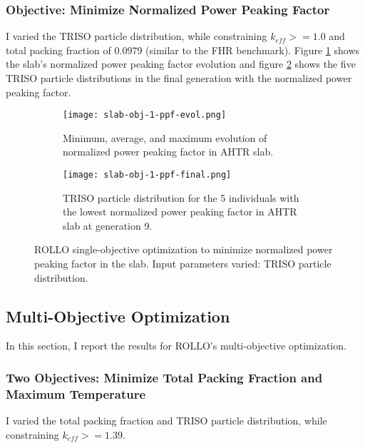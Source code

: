 \subsubsection{Objective: Minimize Normalized Power Peaking Factor}
I varied the TRISO particle distribution, while constraining $k_{eff} >= 1.0$ and 
total packing fraction of 0.0979 (similar to the FHR benchmark). 
Figure \ref{fig:slab-obj-1-ppf-evol} shows the slab's normalized power peaking 
factor evolution and figure \ref{fig:slab-obj-1-ppf-final} shows the five TRISO particle 
distributions in the final generation with the normalized power peaking factor. 
\begin{figure}[]
    \centering
    \begin{subfigure}{\textwidth}
        \texttt{[image: slab-obj-1-ppf-evol.png]}
        \caption{Minimum, average, and maximum evolution of normalized power 
        peaking factor in AHTR slab.}
        \label{fig:slab-obj-1-ppf-evol} 
    \end{subfigure}
    \begin{subfigure}{\textwidth}
        \texttt{[image: slab-obj-1-ppf-final.png]}
        \caption{TRISO particle distribution for the 5 individuals with the 
        lowest normalized power peaking factor in AHTR slab at generation 9.}
        \label{fig:slab-obj-1-ppf-final} 
    \end{subfigure}
    \caption{ROLLO single-objective optimization to minimize normalized power 
    peaking factor in the slab. Input parameters varied: TRISO particle distribution.}
    \label{fig:slab-obj-1-ppf}
\end{figure}

\subsection{Multi-Objective Optimization}
In this section, I report the results for ROLLO's multi-objective optimization. 

\subsubsection{Two Objectives: Minimize Total Packing Fraction and Maximum Temperature}
I varied the total packing fraction and TRISO particle distribution, while 
constraining $k_{eff} >= 1.39$.